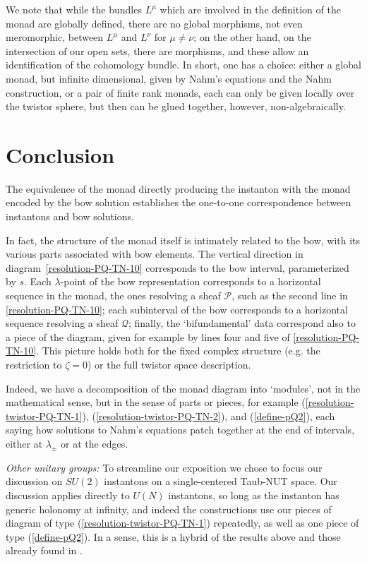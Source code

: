 \documentclass[12pt]{article}
\theoremstyle{definition}
\theoremstyle{remark}
\numberwithin{theorem}{section}
\def\pP{{\mathcal P}}
\def\pQ{{\mathcal Q}}
\begin{document}
We note that while the bundles $L^\mu$ which are involved in the definition of the monad are globally defined, there are no global morphisms, not even meromorphic, between $L^\mu$ and $L^\nu$ for $\mu\neq \nu$; on the other hand, on the intersection of  our open sets, there are morphisms, and these allow an identification of the cohomology bundle. In short, one has a choice: either a global monad, but infinite dimensional, given by Nahm's equations and the Nahm construction, or a pair of finite rank monads, each can only be given locally over the twistor sphere, but then can be glued together, however, non-algebraically.

\section{Conclusion}
 
 
The equivalence of the monad directly producing the instanton with the monad encoded by the bow solution establishes the one-to-one correspondence between instantons and  bow solutions.  

In fact, the structure of the monad itself is intimately related to the bow, with its various parts associated with bow elements.  The vertical direction in diagram~\eqref{resolution-PQ-TN-10} corresponds to the bow interval, parameterized by $s.$ Each $\lambda$-point of the bow representation corresponds to a horizontal sequence in the monad, the ones resolving a sheaf $\pP$, such as the second line in \eqref{resolution-PQ-TN-10}; each  subinterval of the bow corresponds to a  horizontal sequence resolving a sheaf $\pQ$; finally, the `bifundamental' data correspond also to a piece of the diagram, given for example by lines  four and five of \eqref{resolution-PQ-TN-10}. This picture holds both for the fixed complex structure (e.g. the restriction to $\zeta= 0$) or the full twistor space description.

Indeed, we have a decomposition of the monad diagram into `modules', not in the mathematical sense, but in the sense of parts or pieces, for example (\ref {resolution-twistor-PQ-TN-1}), (\ref {resolution-twistor-PQ-TN-2}), and (\ref{define-pQ2}), each saying how  solutions  to Nahm's equations patch together at the end of intervals, either at $\lambda_\pm$ or at the edges.

{\it Other unitary groups:} To streamline our exposition we chose to focus our discussion on $SU(2)$ instantons on a single-centered Taub-NUT space.  Our discussion applies  directly to $U(N)$ instantons,  so long as the instanton has generic holonomy at infinity, and indeed the constructions use our pieces of diagram of type (\ref {resolution-twistor-PQ-TN-1}) repeatedly, as well as one piece of type (\ref{define-pQ2}). In a sense, this is a hybrid of the results above and those already found in \cite{HurtubiseMurray}.
\end{document}
